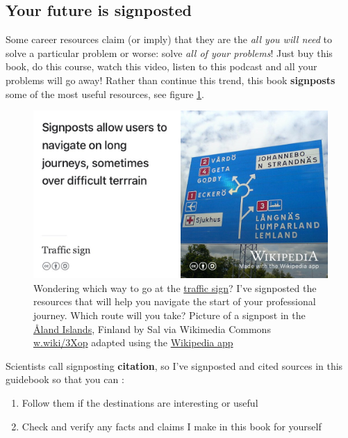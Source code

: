 \documentclass[
]{book}
\providecommand{\tightlist}{%
  \setlength{\itemsep}{0pt}\setlength{\parskip}{0pt}}
\begin{document}
\hypertarget{signposted}{%
\subsection{Your future is signposted}\label{signposted}}

Some career resources claim (or imply) that they are the \emph{all you will need} to solve a particular problem or worse: solve \emph{all of your problems}! Just buy this book, do this course, watch this video, listen to this podcast and all your problems will go away! Rather than continue this trend, this book \textbf{signposts} some of the most useful resources, see figure \ref{fig:signposting-fig}.

\begin{figure}

{\centering \includegraphics[width=1\linewidth]{images/signposting} 

}

\caption{Wondering which way to go at the \href{https://en.wikipedia.org/wiki/Traffic_sign}{traffic sign}? I've signposted the resources that will help you navigate the start of your professional journey. Which route will you take? Picture of a signpost in the \href{https://en.wikipedia.org/wiki/\%C3\%85land_Islands}{Åland Islands}, Finland by Sal via Wikimedia Commons \href{https://w.wiki/3Xop}{w.wiki/3Xop} adapted using the \href{https://apps.apple.com/us/app/wikipedia/id324715238}{Wikipedia app}}\label{fig:signposting-fig}
\end{figure}



Scientists call signposting \textbf{citation}, so I've signposted and cited sources in this guidebook so that you can :

\begin{enumerate}
\def\labelenumi{\arabic{enumi}.}
\tightlist
\item
  Follow them if the destinations are interesting or useful
\item
  Check and verify any facts and claims I make in this book for yourself
\end{enumerate}
\end{document}
